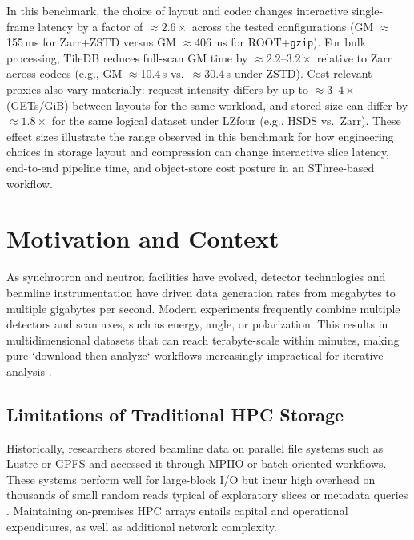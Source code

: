 \documentclass[nomenclature, english, bibtex]{kththesis}
\numberwithin{listing}{chapter}
\begin{document}
In this benchmark, the choice of layout and codec changes interactive single-frame latency by a factor of $\approx 2.6\times$ across the tested configurations (\gls{GM} $\approx$155\,ms for Zarr+\gls{ZSTD} versus \gls{GM} $\approx$406\,ms for \gls{ROOT}+\texttt{gzip}). For bulk processing, TileDB reduces full-scan \gls{GM} time by $\approx 2.2$--$3.2\times$ relative to Zarr across codecs (e.g., \gls{GM} $\approx$10.4\,s vs.\ $\approx$30.4\,s under \gls{ZSTD}). Cost-relevant proxies also vary materially: request intensity differs by up to $\approx 3$--$4\times$ (GETs/GiB) between layouts for the same workload, and stored size can differ by $\approx 1.8\times$ for the same logical dataset under \gls{LZfour} (e.g., \gls{HSDS} vs.\ Zarr). These effect sizes illustrate the range observed in this benchmark for how engineering choices in storage layout and compression can change interactive slice latency, end-to-end pipeline time, and object-store cost posture in an \gls{SThree}-based workflow.


\section{Motivation and Context}
As synchrotron and neutron facilities have evolved, detector technologies and beamline instrumentation have driven data generation rates from megabytes to multiple gigabytes per second. Modern experiments frequently combine multiple detectors and scan axes, such as energy, angle, or polarization. This results in multidimensional datasets that can reach terabyte-scale within minutes, making pure `download-then-analyze` workflows increasingly impractical for iterative analysis \cite{celcer2018gigafrost}.

\subsection{Limitations of Traditional HPC Storage}
Historically, researchers stored beamline data on parallel file systems such as Lustre or \gls{GPFS} and accessed it through \gls{MPIIO} or batch-oriented workflows. These systems perform well for large-block I/O but incur high overhead on thousands of small random reads typical of exploratory slices or metadata queries \cite{narayan2010characterization}. Maintaining on-premises \gls{HPC} arrays entails capital and operational expenditures, as well as additional network complexity.
\end{document}
